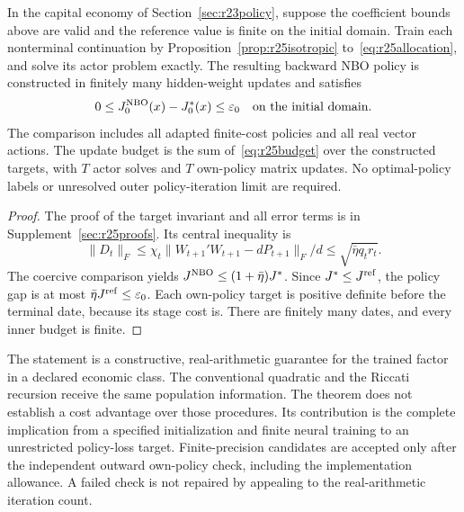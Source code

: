 \begin{theorem}
\label{thm:r25finitepolicy}
In the capital economy of Section~\ref{sec:r23policy}, suppose the coefficient
bounds above are valid and the reference value is finite on the initial
domain. Train each nonterminal continuation by
Proposition~\ref{prop:r25isotropic} to~\eqref{eq:r25allocation}, and solve
its actor problem exactly. The resulting backward NBO policy is constructed
in finitely many hidden-weight updates and satisfies
\begin{equation}
 0\leq J_0^{\rm NBO}(x)-J_0^*(x)\leq\varepsilon_0
 \quad\text{on the initial domain}.
 \label{eq:r25policy}
\end{equation}
The comparison includes all adapted finite-cost policies and all real vector
actions. The update budget is the sum of~\eqref{eq:r25budget} over the
constructed targets, with $T$ actor solves and $T$ own-policy matrix updates.
No optimal-policy labels or unresolved outer policy-iteration limit are
required.
\end{theorem}

\begin{proof}
The proof of the target invariant and all error terms is in
Supplement~\ref{sec:r25proofs}. Its central inequality is
\[
 \|D_t\|_F\leq\chi_t\|W_{t+1}'W_{t+1}-dP_{t+1}\|_F/d
                  \leq\sqrt{\bar\eta q_t r_t}.
\]
The coercive comparison yields $J^{\rm NBO}\leq(1+\bar\eta)J^*$.
Since $J^*\leq J^{\rm ref}$, the policy gap is at most
$\bar\eta J^{\rm ref}\leq\varepsilon_0$. Each own-policy target is
positive definite before the terminal date, because its stage cost is.
There are finitely many dates, and every inner budget is finite.
\end{proof}

The statement is a constructive, real-arithmetic guarantee for the trained
factor in a declared economic class. The conventional quadratic and the
Riccati recursion receive the same population information. The theorem does
not establish a cost advantage over those procedures. Its contribution is
the complete implication from a specified initialization and finite neural
training to an unrestricted policy-loss target. Finite-precision candidates
are accepted only after the independent outward own-policy check, including
the implementation allowance. A failed check is not repaired by appealing
to the real-arithmetic iteration count.
